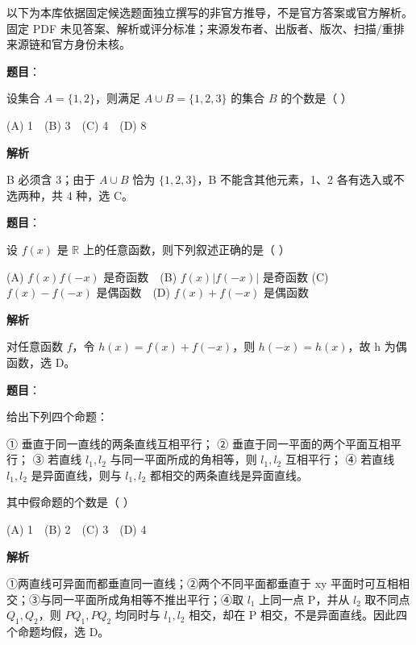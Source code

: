 

\begin{gktip}
以下为本库依据固定候选题面独立撰写的非官方推导，不是官方答案或官方解析。固定 PDF 未见答案、解析或评分标准；来源发布者、出版者、版次、扫描/重排来源链和官方身份未核。
\end{gktip}

\begin{answer}

\textbf{题目}：

设集合 $A=\{1,2\}$，则满足 $A\cup B=\{1,2,3\}$ 的集合 $B$ 的个数是（ ）

(A) 1　(B) 3　(C) 4　(D) 8

\textbf{解析}

B 必须含 3；由于 $A\cup B$ 恰为 $\{1,2,3\}$，B 不能含其他元素，1、2 各有选入或不选两种，共 4 种，选 C。


\end{answer}
\begin{answer}

\textbf{题目}：

设 $f(x)$ 是 $\mathbb R$ 上的任意函数，则下列叙述正确的是（ ）

(A) $f(x)f(-x)$ 是奇函数　(B) $f(x)|f(-x)|$ 是奇函数
(C) $f(x)-f(-x)$ 是偶函数　(D) $f(x)+f(-x)$ 是偶函数

\textbf{解析}

对任意函数 $f$，令 $h(x)=f(x)+f(-x)$，则 $h(-x)=h(x)$，故 h 为偶函数，选 D。


\end{answer}
\begin{answer}

\textbf{题目}：

给出下列四个命题：

① 垂直于同一直线的两条直线互相平行；
② 垂直于同一平面的两个平面互相平行；
③ 若直线 $l_1,l_2$ 与同一平面所成的角相等，则 $l_1,l_2$ 互相平行；
④ 若直线 $l_1,l_2$ 是异面直线，则与 $l_1,l_2$ 都相交的两条直线是异面直线。

其中假命题的个数是（ ）

(A) 1　(B) 2　(C) 3　(D) 4

\textbf{解析}

①两直线可异面而都垂直同一直线；②两个不同平面都垂直于 xy 平面时可互相相交；③与同一平面所成角相等不推出平行；④取 $l_1$ 上同一点 P，并从 $l_2$ 取不同点 $Q_1,Q_2$，则 $PQ_1,PQ_2$ 均同时与 $l_1,l_2$ 相交，却在 P 相交，不是异面直线。因此四个命题均假，选 D。


\end{answer}
